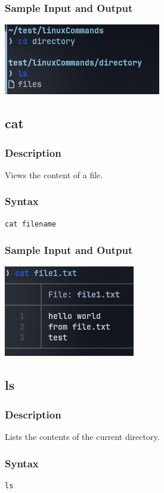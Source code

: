 \subsubsection{Sample Input and Output}
\includegraphics[]{Cycle_1//Outputs/cd.png}


\subsection{cat}
\subsubsection{Description}
Views the content of a file.

\subsubsection{Syntax}
\begin{verbatim}
cat filename
\end{verbatim}

\subsubsection{Sample Input and Output}
\includegraphics[]{Cycle_1//Outputs/cat.png}

\subsection{ls}
\subsubsection{Description}
Lists the contents of the current directory.

\subsubsection{Syntax}
\begin{verbatim}
ls
\end{verbatim}

